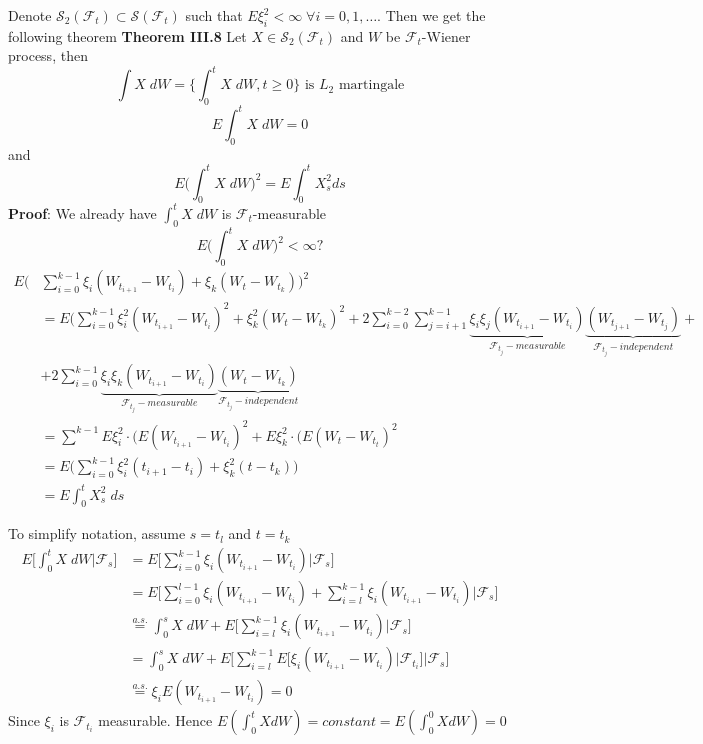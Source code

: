 \documentclass[english]{article}
\newcommand{\ub}{\underbrace}
\newcommand{\note}[1]{\noindent\textbf{#1}}
\newcommand{\F}{\mathcal F}
\newcommand{\as}[1]{\stackrel {a.s.}{#1}}
\begin{document}
\pagebreak Denote $\mathcal S_2(\F_t) \subset \mathcal S(\F_t)$ such that $E\xi^2_i < \infty \; \forall i=0,1,\dots$. Then we get the following theorem \newline
\note{Theorem III.8} Let $X \in \mathcal S_2(\F_t)$ and $W$ be $\F_t$-Wiener process, then 
$$\int X \; dW = \Big\{ \int^t_0 X \; dW, t\geq 0\Big\} \text{ is }L_2 \text{ martingale}$$
$$E\int^t_0 X \; dW = 0$$
and 
$$E\Big(\int^t_0 X \; dW \Big)^2 = E \int^t_0 X^2_s ds$$
\note{Proof}: We already have $\int^t_0 X \; dW$ is $\F_t$-measurable \newline
$$E\Big(\int^t_0 X \; dW \Big)^2 < \infty ?$$
\begin{align*}
E\Big( &\sum^{k-1}_{i=0} \xi_i (W_{t_{i+1}} - W_{t_i}) + \xi_k (W_t - W_{t_k}) \Big)^2 \\
& = E \Big(\sum^{k-1}_{i=0} \xi^2_i (W_{t_{i+1}} - W_{t_i})^2 + \xi^2_k (W_t - W_{t_k})^2 + 2 \sum^{k-2}_{i=0} \sum^{k-1}_{j=i+1} \ub{\xi_i \xi_j (W_{t_{i+1}} - W_{t_i})}_{\F_{t_j}-measurable}\ub{(W_{t_{j+1}} - W_{t_j})}_{\F_{t_j}-independent} + \\
& + 2 \sum^{k-1}_{i=0} \ub{\xi_i \xi_k  (W_{t_{i+1}} - W_{t_i})}_{\F_{t_j}-measurable}\ub{(W_{t} - W_{t_k})}_{\F_{t_j}-independent} \\
&= \sum^{k-1} E \xi_i^2 \cdot (E(W_{t_{i+1}} - W_{t_i})^2 +E \xi_k^2 \cdot (E(W_{t} - W_{t_t})^2 \\
& = E\Big( \sum^{k-1}_{i=0} \xi^2_i (t_{i+1} - t_i) + \xi^2_{k} (t-t_k)\Big) \\
& = E\int^t_0 X^2_s \; ds
\end{align*}

To simplify notation, assume $s=t_l$ and $t = t_k$
\begin{align*} E\Big[ \int^t_0 X\; dW | \F_s] &= E \Big[\sum^{k-1}_{i=0} \xi_i (W_{t_{i+1}} - W_{t_i} ) |\F_s \Big] \\
& = E \Big[ \sum^{l-1}_{i=0} \xi_i (W_{t_{i+1}} - W_{t_i} ) + \sum^{k-1}_{i=l} \xi_i (W_{t_{i+1}} - W_{t_i} ) \Big| \F_s \Big] \\
& \as= \int^s_0 X \; dW + E\Big[\sum^{k-1}_{i=l} \xi_i (W_{t_{i+1}} - W_{t_i} ) \Big| \F_s \Big] \\
&= \int^s_0 X \; dW + E\Big[\sum^{k-1}_{i=l} E\big[\xi_i (W_{t_{i+1}} - W_{t_i} )|\F_{t_i}\big] \Big| \F_s \Big] \\
&\as= \xi_i E(W_{t_{i+1}} - W_{t_i}) = 0
\end{align*}
Since $\xi_i$ is $\F_{t_i}$ measurable. \newline
Hence $E(\int^t_0 X dW) = constant = E(\int^0_0 X dW) = 0$ \newline
\end{document}
